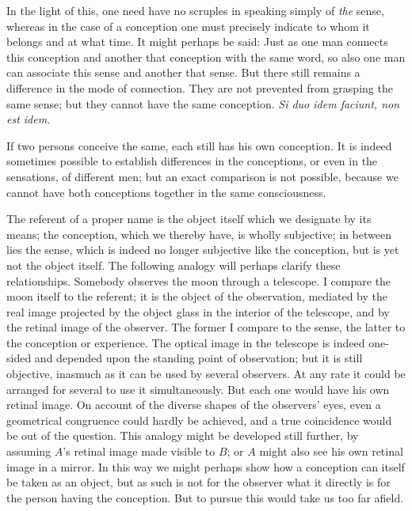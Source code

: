 \documentclass[twoside,12pt,a4paper]{article}
\begin{document}
In the light of this, one need have no scruples in speaking simply of
\emph{the} sense, whereas in the case of a conception one must
precisely indicate to whom it belongs and at what time. It might
perhaps be said: Just as one man connects this conception and another
that conception with the same word, so also one man can associate this
sense and another that sense. But there still remains a difference in
the mode of connection. They are not prevented from grasping the same
sense;  but they cannot have the same conception. {\it
  Si duo idem faciunt, non est idem}.

If two persons conceive the same, each still has his own conception.
It is indeed sometimes possible to establish differences in the
conceptions, or even in the sensations, of different men; but an exact
comparison is not possible, because we cannot have both conceptions
together in the same consciousness.

The referent of a proper name is the object itself which we designate
by its means; the conception, which we thereby have, is wholly
subjective; in between lies the sense, which is indeed no longer
subjective like the conception, but is yet not the object itself. The
following analogy will perhaps clarify these relationships. Somebody
observes the moon through a telescope. I compare the moon itself to
the referent; it is the object of the observation, mediated by the
real image projected by the object glass in the interior of the
telescope, and by the retinal image of the observer. The former I
compare to the sense, the latter to the conception or experience. The
optical image in the telescope is indeed one-sided and depended upon
the standing point of observation; but it is still objective, inasmuch
as it can be used by several observers. At any rate it could be
arranged for several to use it simultaneously. But each one would have
his own retinal image. On account of the diverse shapes of the
observers' eyes, even a geometrical congruence could hardly be
achieved, and a true coincidence would be out of the question. This
analogy might be developed still further, by assuming $A$'s retinal
image made visible to $B$; or $A$ might also see his own retinal image
in a mirror. In this way we might perhaps show how a conception can
itself be taken as an object, but as such is not for the observer what
it directly is for the person having the conception. But to pursue
this would take us too far afield.
\end{document}
